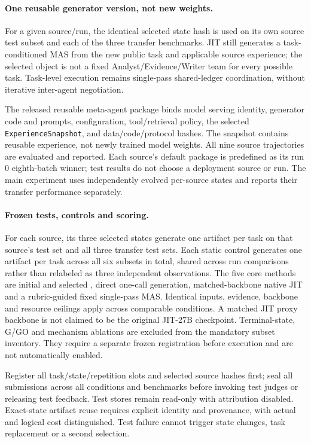 \paragraph{One reusable generator version, not new weights.}
For a given source/run, the identical selected state hash is used on its
own source test subset and each of the three transfer benchmarks. JIT still
generates a task-conditioned MAS from the new public task and applicable
source experience; the selected object is not
a fixed Analyst/Evidence/Writer team for every possible task. Task-level
execution remains single-pass shared-ledger coordination, without iterative
inter-agent negotiation.

The released reusable meta-agent package binds model serving identity,
generator code and prompts, configuration, tool/retrieval policy, the
selected \texttt{ExperienceSnapshot}, and data/code/protocol hashes.
The snapshot contains reusable experience, not newly trained model
weights. All nine source trajectories are evaluated and reported. Each
source's default package is predefined as its run 0 eighth-batch winner;
test results do not choose a deployment source or run. The main experiment
uses independently evolved per-source states and reports their transfer
performance separately.

\paragraph{Frozen tests, controls and scoring.}
For each source, its three selected states generate one artifact per task
on that source's test set and all three transfer test sets. Each static
control generates one artifact per task across all six subsets in
total, shared across run comparisons rather than relabeled as three
independent observations. The five core methods are initial and selected
\method, direct one-call generation, matched-backbone native JIT and a
rubric-guided fixed single-pass MAS. Identical inputs, evidence, backbone
and resource ceilings apply across comparable conditions. A matched JIT
proxy backbone is not claimed to be the original JIT-27B checkpoint.
Terminal-state, G/GO and mechanism ablations are excluded from the mandatory
subset inventory.
They require a separate frozen registration before execution and are not
automatically enabled.

Register all task/state/repetition slots and selected source hashes first;
seal all submissions across all conditions and benchmarks before invoking
test judges or releasing test feedback. Test stores remain read-only with
attribution disabled. Exact-state artifact reuse requires explicit identity
and provenance, with actual and logical cost distinguished. Test failure
cannot trigger state changes, task replacement or a second selection.

